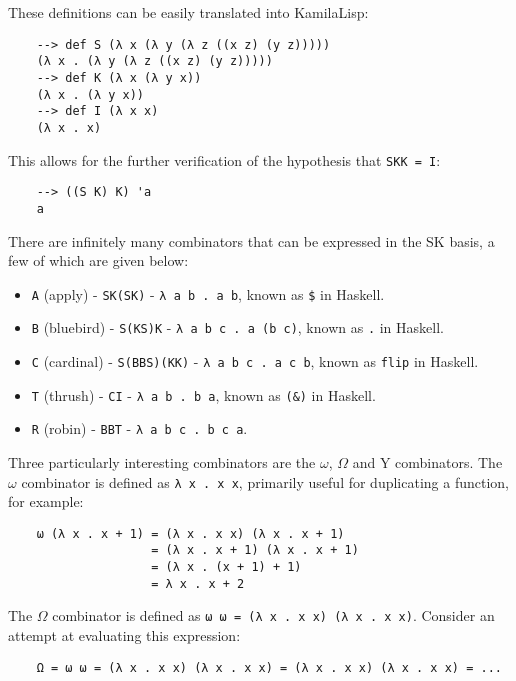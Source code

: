 These definitions can be easily translated into KamilaLisp:

\begin{Verbatim}
    --> def S (λ x (λ y (λ z ((x z) (y z)))))
    (λ x . (λ y (λ z ((x z) (y z)))))
    --> def K (λ x (λ y x))
    (λ x . (λ y x))
    --> def I (λ x x)
    (λ x . x)
\end{Verbatim}

This allows for the further verification of the hypothesis that \verb|SKK = I|:

\begin{Verbatim}
    --> ((S K) K) 'a
    a
\end{Verbatim}

There are infinitely many combinators that can be expressed in the SK basis, a few of which are given below:

\begin{itemize}
    \item \verb|A| (apply) - \verb|SK(SK)| - \verb|λ a b . a b|, known as \verb|$| in Haskell.
    \item \verb|B| (bluebird) - \verb|S(KS)K| - \verb|λ a b c . a (b c)|, known as \verb|.| in Haskell.
    \item \verb|C| (cardinal) - \verb|S(BBS)(KK)| - \verb|λ a b c . a c b|, known as \verb|flip| in Haskell.
    \item \verb|T| (thrush) - \verb|CI| - \verb|λ a b . b a|, known as \verb|(&)| in Haskell.
    \item \verb|R| (robin) - \verb|BBT| - \verb|λ a b c . b c a|.
\end{itemize}

Three particularly interesting combinators are the $\omega$, $\Omega$ and Y combinators. The $\omega$ combinator is defined as \verb|λ x . x x|, primarily useful for duplicating a function, for example:

\begin{Verbatim}
    ω (λ x . x + 1) = (λ x . x x) (λ x . x + 1)
                    = (λ x . x + 1) (λ x . x + 1)
                    = (λ x . (x + 1) + 1)
                    = λ x . x + 2
\end{Verbatim}

The $\Omega$ combinator is defined as \verb|ω ω = (λ x . x x) (λ x . x x)|. Consider an attempt at evaluating this expression:

\begin{Verbatim}
    Ω = ω ω = (λ x . x x) (λ x . x x) = (λ x . x x) (λ x . x x) = ...
\end{Verbatim}


